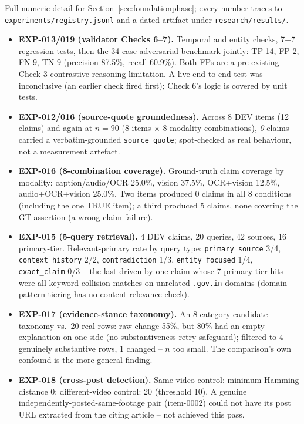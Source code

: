 \documentclass[conference]{IEEEtran}
\begin{document}
Full numeric detail for Section~\ref{sec:foundationphase}; every number
traces to \texttt{experiments/registry.jsonl} and a dated artifact under
\texttt{research/results/}.

\begin{itemize}
\item \textbf{EXP-013/019 (validator Checks 6--7).} Temporal and entity checks, 7+7 regression tests, then the 34-case adversarial benchmark jointly: TP 14, FP 2, FN 9, TN 9 (precision 87.5\%, recall 60.9\%). Both FPs are a pre-existing Check-3 contrastive-reasoning limitation. A live end-to-end test was inconclusive (an earlier check fired first); Check 6's logic is covered by unit tests.
\item \textbf{EXP-012/016 (source-quote groundedness).} Across 8 DEV items (12 claims) and again at $n{=}90$ (8 items $\times$ 8 modality combinations), \emph{0} claims carried a verbatim-grounded \texttt{source\_quote}; spot-checked as real behaviour, not a measurement artefact.
\item \textbf{EXP-016 (8-combination coverage).} Ground-truth claim coverage by modality: caption/audio/OCR 25.0\%, vision 37.5\%, OCR+vision 12.5\%, audio+OCR+vision 25.0\%. Two items produced 0 claims in all 8 conditions (including the one TRUE item); a third produced 5 claims, none covering the GT assertion (a wrong-claim failure).
\item \textbf{EXP-015 (5-query retrieval).} 4 DEV claims, 20 queries, 42 sources, 16 primary-tier. Relevant-primary rate by query type: \texttt{primary\_source} 3/4, \texttt{context\_history} 2/2, \texttt{contradiction} 1/3, \texttt{entity\_focused} 1/4, \texttt{exact\_claim} 0/3 -- the last driven by one claim whose 7 primary-tier hits were all keyword-collision matches on unrelated \texttt{.gov.in} domains (domain-pattern tiering has no content-relevance check).
\item \textbf{EXP-017 (evidence-stance taxonomy).} An 8-category candidate taxonomy vs.\ 20 real rows: raw change 55\%, but 80\% had an empty explanation on one side (no substantiveness-retry safeguard); filtered to 4 genuinely substantive rows, 1 changed -- $n$ too small. The comparison's own confound is the more general finding.
\item \textbf{EXP-018 (cross-post detection).} Same-video control: minimum Hamming distance 0; different-video control: 20 (threshold 10). A genuine independently-posted-same-footage pair (item-0002) could not have its post URL extracted from the citing article -- not achieved this pass.

\end{itemize}
\end{document}
